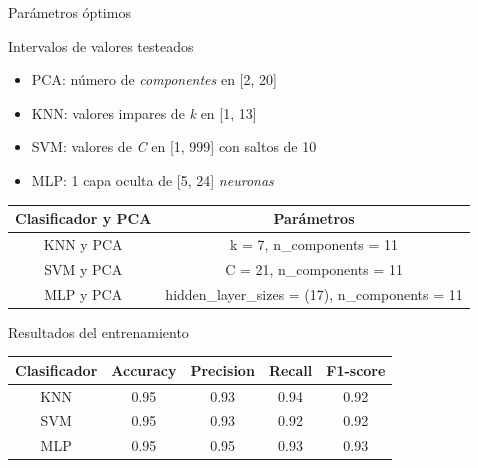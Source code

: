 \documentclass{beamer}
\begin{document}
\begin{frame}{Parámetros óptimos}
\begin{block}{Intervalos de valores testeados}
\begin{itemize}
    \item PCA: número de \textit{componentes} en [2, 20]
    \item KNN: valores impares de \textit{k} en [1, 13]
    \item SVM: valores de \textit{C} en [1, 999] con saltos de 10
    \item MLP: 1 capa oculta de [5, 24] \textit{neuronas}
\end{itemize}
\end{block}

\begin{table}[H]
\begin{center}
\begin{tabular}{|c|c|}
    \hline
    \textbf{Clasificador y PCA} & \textbf{Parámetros} \\
    \hline
     KNN y PCA & k = 7, n\_components = 11\\
     SVM y PCA & C = 21, n\_components = 11\\
     MLP y PCA & hidden\_layer\_sizes = (17), n\_components = 11\\
     \hline
 \end{tabular}
\end{center}
\end{table}
\end{frame}

\begin{frame}{Resultados del entrenamiento}
\begin{table}[H]
\begin{center}
\begin{tabular}{|c|c|c|c|c|}
     \hline
    \textbf{Clasificador} & \textbf{Accuracy} & \textbf{Precision} & \textbf{Recall} & \textbf{F1-score}\\
    \hline
     KNN & 0.95 & 0.93 & 0.94 & 0.92\\
     SVM & 0.95 & 0.93 & 0.92 & 0.92\\
     MLP & 0.95 & 0.95 & 0.93 & 0.93\\
     \hline
\end{tabular}
\end{center}
\end{table}
\end{frame}
\end{document}
